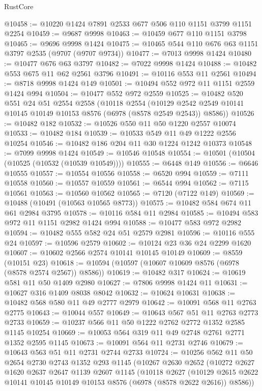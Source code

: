 \begin{lexlean}{RustCore}
\begin{coremodule}
@10458 := @10220 @1424 @7891 @2533 @677 @506 @110 @1151 @3799 @1151 @2254
@10459 := @9687 @9998
@10463 := @10459 @677 @110 @1151 @3798
@10465 := @9696 @9998 @1424
@10475 := @10465 @544 @110 @676 @63 @1151 @3797 @2535 (@9707 (@9707 @9734))
@10477 := @7013 @9998 @1424
@10480 := @10477 @676 @63 @3797
@10482 := @7022 @9998 @1424
@10488 := @10482 @553 @675 @11 @62 @2561 @3796
@10491 := @10116 @553 @11 @2561
@10494 := @8718 @9998 @1424 @149
@10501 := @10494 @552 @972 @11 @1151 @2559 @1424 @994
@10504 := @10477 @552 @972 @2559
@10525 := @10482
    @520
    @551
    @24
    @51
    @2554
    @2558
    (@10118
      @2554
      (@10129 @2542 @2549 @10141 @10145 @10149 @10153 @8576 (@6978 (@8578 @2549 @2543)) @8586))
@10526 := @10482 @182
@10532 := @10526 @550 @11 @50 @1220 @2557 @10074
@10533 := @10482 @184
@10539 := @10533 @549 @11 @49 @1222 @2556 @10254
@10546 := @10482 @186 @204 @11 @30 @1224 @1242 @10373
@10548 := @7099 @9998 @1424
@10549 := @10546 @10548
@10554 := @10501 (@10504 (@10525 (@10532 (@10539 @10549))))
@10555 := @6448 @149
@10556 := @6646 @10555
@10557 := @10554 @10556
@10558 := @6520 @994
@10559 := @7111 @10558
@10560 := @10557 @10559
@10561 := @6544 @994
@10562 := @7115 @10561
@10563 := @10560 @10562
@10565 := @7120 (@7122 @149)
@10569 := @10488 (@10491 (@10563 @10565 @8773))
@10575 := @10482 @584 @674 @11 @61 @2984 @3795
@10578 := @10116 @584 @11 @2984
@10585 := @10494 @583 @972 @11 @1151 @2982 @1424 @994
@10588 := @10477 @583 @972 @2982
@10594 := @10482 @555 @582 @24 @51 @2579 @2981
@10596 := @10116 @555 @24
@10597 := @10596 @2579
@10602 := @10124 @23 @36 @24 @2299 @1620
@10607 := @10602 @2566 @2574 @10141 @10145 @10149
@10609 := @8559 (@10151 @23)
@10618 := @10594 (@10597 (@10607 @10609 @8576 (@6978 (@8578 @2574 @2567)) @8586))
@10619 := @10482 @317
@10624 := @10619 @581 @11 @50 @1409 @2980
@10627 := @7806 @9998 @1424 @11
@10631 := @10627 @316 @1409 @8038 @8042
@10632 := @10624 @10631
@10638 := @10482 @568 @580 @11 @49 @2777 @2979
@10642 := @10091 @568 @11 @2763 @2775
@10643 := @10044 @557
@10649 := @10643 @567 @51 @11 @2763 @2773 @2733
@10659 := @10237 @566 @11 @50 @1222 @2762 @2772 @1352 @2585 @1145 @10254
@10669 := @10053 @564 @319 @11 @49 @2748 @2761 @2771 @1352 @2595 @1145
@10673 := @10091 @564 @11 @2731 @2746
@10679 := @10643 @563 @51 @11 @2731 @2744 @2733
@10724 := @10256
    @562
    @11
    @50
    @2654
    @2730
    @2743
    @1352
    @293
    @1145
    (@10267
      @2630
      @2652
      (@10272
        @2627
        @1620
        @2637
        @2647
        @1139
        @2607
        @1145
        (@10118
          @2627
          (@10129 @2615 @2622 @10141 @10145 @10149 @10153 @8576 (@6978 (@8578 @2622 @2616)) @8586))

\end{coremodule}
\end{lexlean}
